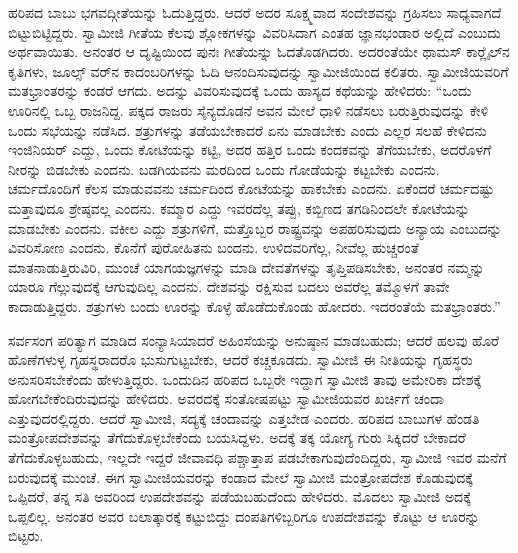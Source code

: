  ಹರಿಪದ ಬಾಬು ಭಗವದ್ಗೀತೆಯನ್ನು ಓದುತ್ತಿದ್ದರು. ಆದರೆ ಅದರ ಸೂಕ್ಷ್ಮವಾದ ಸಂದೇಶವನ್ನು ಗ್ರಹಿಸಲು ಸಾಧ್ಯವಾಗದೆ ಬಿಟ್ಟುಬಿಟ್ಟಿದ್ದರು. ಸ್ವಾಮೀಜಿ ಗೀತೆಯ ಕೆಲವು ಶ್ಲೋಕಗಳನ್ನು ವಿವರಿಸಿದಾಗ ಎಂತಹ ಜ್ಞಾನಭಂಡಾರ ಅಲ್ಲಿದೆ ಎಂಬುದು ಅರ್ಥವಾಯಿತು. ಅನಂತರ ಆ ದೃಷ್ಟಿಯಿಂದ ಪುನಃ ಗೀತೆಯನ್ನು ಓದತೊಡಗಿದರು. ಅದರಂತೆಯೇ ಥಾಮಸ್ ಕಾರ‍್ಲೈಲ್‍ನ ಕೃತಿಗಳು, ಜೂಲ್ಸ್ ‍ವರ್​ನ ಕಾದಂಬರಿಗಳನ್ನು ಓದಿ ಆನಂದಿಸುವುದನ್ನು ಸ್ವಾಮೀಜಿಯಿಂದ ಕಲಿತರು. ಸ್ವಾಮೀಜಿಯವರಿಗೆ ಮತಭ್ರಾಂತರನ್ನು ಕಂಡರೆ ಆಗದು. ಅದನ್ನು ವಿವರಿಸುವುದಕ್ಕೆ ಒಂದು ಹಾಸ್ಯದ ಕಥೆಯನ್ನು ಹೇಳಿದರು: “ಒಂದು ಊರಿನಲ್ಲಿ ಒಬ್ಬ ರಾಜನಿದ್ದ. ಪಕ್ಕದ ರಾಜರು ಸೈನ್ಯದೊಡನೆ ಅವನ ಮೇಲೆ ಧಾಳಿ ನಡೆಸಲು ಬರುತ್ತಿರುವುದನ್ನು ಕೇಳಿ ಒಂದು ಸಭೆಯನ್ನು ನಡೆಸಿದ. ಶತ್ರುಗಳನ್ನು ತಡೆಯಬೇಕಾದರೆ ಏನು ಮಾಡಬೇಕು ಎಂದು ಎಲ್ಲರ ಸಲಹೆ ಕೇಳಿದನು ಇಂಜಿನಿಯರ್ ಎದ್ದು, ಒಂದು ಕೋಟೆಯನ್ನು ಕಟ್ಟಿ, ಅದರ ಹತ್ತಿರ ಒಂದು ಕಂದಕವನ್ನು ತೆಗೆಯಬೇಕು, ಅದರೊಳಗೆ ನೀರನ್ನು ಬಿಡಬೇಕು ಎಂದನು. ಬಡಗಿಯವನು ಮರದಿಂದ ಒಂದು ಗೋಡೆಯನ್ನು ಕಟ್ಟಬೇಕು ಎಂದನು. ಚರ್ಮದೊಂದಿಗೆ ಕೆಲಸ ಮಾಡುವವನು ಚರ್ಮದಿಂದ ಕೋಟೆಯನ್ನು ಹಾಕಬೇಕು ಎಂದನು. ಏಕೆಂದರೆ ಚರ್ಮದಷ್ಟು ಮತ್ತಾವುದೂ ಶ್ರೇಷ್ಠವಲ್ಲ ಎಂದನು. ಕಮ್ಮಾರ ಎದ್ದು ಇವರದೆಲ್ಲ ತಪ್ಪು, ಕಬ್ಬಿಣದ ತಗಡಿನಿಂದಲೇ ಕೋಟೆಯನ್ನು ಮಾಡಬೇಕು ಎಂದನು. ವಕೀಲ ಎದ್ದು ಶತ್ರುಗಳಿಗೆ, ಮತ್ತೊಬ್ಬರ ರಾಷ್ಟ್ರವನ್ನು ಅಪಹರಿಸುವುದು ಅನ್ಯಾಯ ಎಂಬುದನ್ನು ವಿವರಿಸೋಣ ಎಂದನು. ಕೊನೆಗೆ ಪುರೋಹಿತನು ಬಂದನು. ಉಳಿದವರಿಗೆಲ್ಲ, ನೀವೆಲ್ಲ ಹುಚ್ಚರಂತೆ ಮಾತನಾಡುತ್ತಿರುವಿರಿ, ಮುಂಚೆ ಯಾಗಯಜ್ಞಗಳನ್ನು ಮಾಡಿ ದೇವತೆಗಳನ್ನು ತೃಪ್ತಿಪಡಿಸಬೇಕು, ಅನಂತರ ನಮ್ಮನ್ನು ಯಾರೂ ಗೆಲ್ಲುವುದಕ್ಕೆ ಆಗುವುದಿಲ್ಲ ಎಂದನು. ದೇಶವನ್ನು ರಕ್ಷಿಸುವ ಬದಲು ಅವರೆಲ್ಲ ತಮ್ಮೊಳಗೆ ತಾವೇ ಕಾದಾಡುತ್ತಿದ್ದರು. ಶತ್ರುಗಳು ಬಂದು ಊರನ್ನು ಕೊಳ್ಳೆ ಹೊಡೆದುಕೊಂಡು ಹೋದರು. ಇದರಂತೆಯೆ ಮತಭ್ರಾಂತರು.” 

 ಸರ್ವಸಂಗ ಪರಿತ್ಯಾಗ ಮಾಡಿದ ಸಂನ್ಯಾಸಿಯಾದರೆ ಅಹಿಂಸೆಯನ್ನು ಅನುಷ್ಠಾನ ಮಾಡಬಹುದು; ಆದರೆ ಹಲವು ಹೊರೆ ಹೊಣೆಗಳುಳ್ಳ ಗೃಹಸ್ಥರಾದರೊ ಭುಸುಗುಟ್ಟಬೇಕು, ಆದರೆ ಕಚ್ಚಕೂಡದು. ಸ್ವಾಮೀಜಿ ಈ ನೀತಿಯನ್ನು ಗೃಹಸ್ಥರು ಅನುಸರಿಸಬೇಕೆಂದು ಹೇಳುತ್ತಿದ್ದರು. ಒಂದುದಿನ ಹರಿಪದ ಒಬ್ಬರೇ ಇದ್ದಾಗ ಸ್ವಾಮೀಜಿ ತಾವು ಅಮೇರಿಕಾ ದೇಶಕ್ಕೆ ಹೋಗಬೇಕೆಂದಿರುವುದನ್ನು ಹೇಳಿದರು. ಅವರದಕ್ಕೆ ಸಂತೋಷಪಟ್ಟು ಸ್ವಾಮೀಜಿಯವರ ಖರ್ಚಿಗೆ ಚಂದಾ ಎತ್ತುವುದರಲ್ಲಿದ್ದರು. ಆದರೆ ಸ್ವಾಮೀಜಿ, ಸದ್ಯಕ್ಕೆ ಚಂದಾವನ್ನು ಎತ್ತಬೇಡ ಎಂದರು. ಹರಿಪದ ಬಾಬುಗಳ ಹೆಂಡತಿ ಮಂತ್ರೋಪದೇಶವನ್ನು ತೆಗೆದುಕೊಳ್ಳಬೇಕೆಂದು ಬಯಸಿದ್ದಳು. ಅದಕ್ಕೆ ತಕ್ಕ ಯೋಗ್ಯ ಗುರು ಸಿಕ್ಕಿದರೆ ಬೇಕಾದರೆ ತೆಗೆದುಕೊಳ್ಳಬಹುದು, ಇಲ್ಲದೇ ಇದ್ದರೆ ಜೀವಾವಧಿ ಪಶ್ಚಾತ್ತಾಪ ಪಡಬೇಕಾಗುವುದೆಂದಿದ್ದರು, ಸ್ವಾಮೀಜಿ ಇವರ ಮನೆಗೆ ಬರುವುದಕ್ಕೆ ಮುಂಚೆ. ಈಗ ಸ್ವಾಮೀಜಿಯವರನ್ನು ಕಂಡಾದ ಮೇಲೆ ಸ್ವಾಮೀಜಿ ಮಂತ್ರೋಪದೇಶ ಕೊಡುವುದಕ್ಕೆ ಒಪ್ಪಿದರೆ, ತನ್ನ ಸತಿ ಅವರಿಂದ ಉಪದೇಶವನ್ನು ಪಡೆಯಬಹುದೆಂದು ಹೇಳಿದರು. ಮೊದಲು ಸ್ವಾಮೀಜಿ ಅದಕ್ಕೆ ಒಪ್ಪಲಿಲ್ಲ. ಅನಂತರ ಅವರ ಬಲಾತ್ಕಾರಕ್ಕೆ ಕಟ್ಟುಬಿದ್ದು ದಂಪತಿಗಳಿಬ್ಬರಿಗೂ ಉಪದೇಶವನ್ನು ಕೊಟ್ಟು ಆ ಊರನ್ನು ಬಿಟ್ಟರು. 

